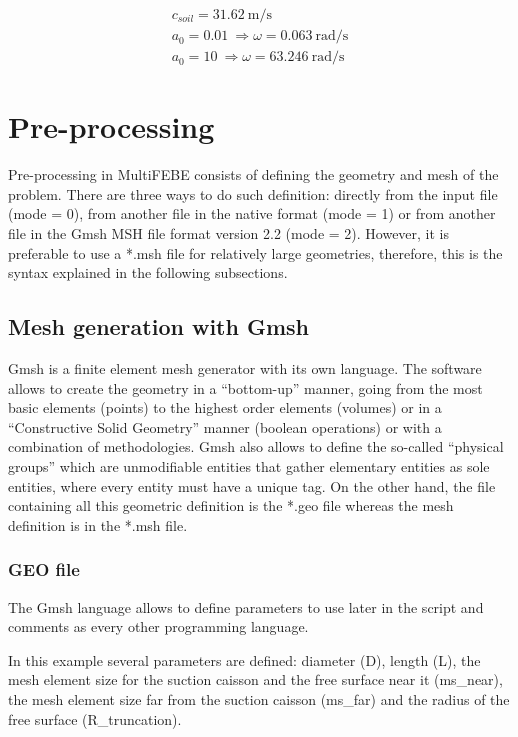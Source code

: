 \documentclass[a4]{article}
\begin{document}
\begin{equation}
	\begin{array}{l}
		c_{soil} = 31.62 \medspace \mathrm{m/s} \\
		a_0 = 0.01 \medspace \Longrightarrow \omega = 0.063 \medspace \mathrm{rad/s}\\
		a_0 = 10 \medspace \Longrightarrow \omega = 63.246 \medspace \mathrm{rad/s}
	\end{array}
\end{equation}

\section{Pre-processing} 
Pre-processing in MultiFEBE consists of defining the geometry and mesh of the problem. There are three ways to do such definition: directly from the input file (mode = 0), from another file in the native format (mode = 1) or from another file in the Gmsh MSH file format version 2.2 (mode = 2). However, it is preferable to use a *.msh file for relatively large geometries, therefore, this is the syntax explained in the following subsections.
   
\subsection{Mesh generation with Gmsh}
Gmsh \cite{gmsh, gmshweb} is a finite element mesh generator with its own language. The software allows to create the geometry in a “bottom-up” manner, going from the most basic elements (points) to the highest order elements (volumes) or in a “Constructive Solid Geometry” manner (boolean operations) or with a combination of methodologies. Gmsh also allows to define  the so-called “physical groups” which are unmodifiable entities that gather elementary entities as sole entities, where every entity must have a unique tag. On the other hand, the file containing all this geometric definition is the *.geo file whereas the mesh definition is in the *.msh file. 

\subsubsection{GEO file}
The Gmsh language allows to define parameters to use later in the script and comments as every other programming language. 

In this example several parameters are defined: diameter (D), length (L), the mesh element size for the suction caisson and the free surface near it (ms\_near), the mesh element size far from the suction caisson (ms\_far) and the radius of the free surface (R\_truncation). 
\end{document}
